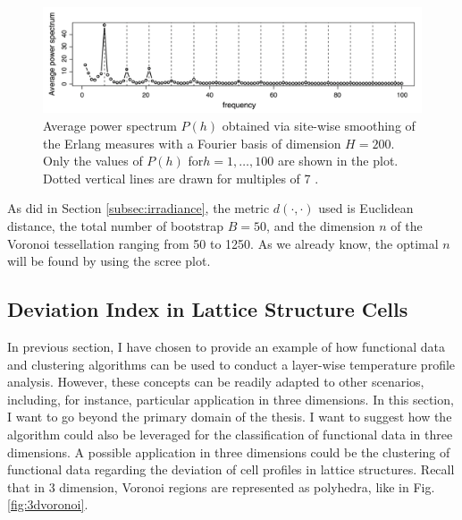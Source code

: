\begin{figure}[H]
    \centering
    \includegraphics[scale=0.6]{Images/fantasmino.png}
    \caption[Spectrum of Erlang data.]{Average power spectrum $P(h)$ obtained via site-wise smoothing of the Erlang measures with a Fourier basis of dimension $H = 200$. Only the values of $P(h)$ for$ h = 1, \dots, 100$ are shown in the plot. Dotted vertical lines are drawn for multiples of 7 \cite{secchi_analysis_2015}.}
    \label{fig:fantasmino}
\end{figure}

As did in Section \ref{subsec:irradiance}, the metric $d(\cdot, \cdot)$ used is Euclidean distance, the total number of bootstrap $B=50$, and the dimension $n$ of the Voronoi tessellation ranging from 50 to 1250. As we already know, the optimal $n$ will be found by using the scree plot.


\subsection{Deviation Index in Lattice Structure Cells}
\label{subsec:devcell}
In previous section, I have chosen to provide an example of how functional data and clustering algorithms can be used to conduct a layer-wise temperature profile analysis. However, these concepts can be readily adapted to other scenarios, including, for instance, particular application in three dimensions. In this section, I want to go beyond the primary domain of the thesis. I want to suggest how the algorithm could also be leveraged for the classification of functional data in three dimensions. A possible application in three dimensions could be the clustering of functional data regarding the deviation of cell profiles in lattice structures. Recall that in 3 dimension, Voronoi regions are represented as polyhedra, like in Fig. \ref{fig:3dvoronoi}.

